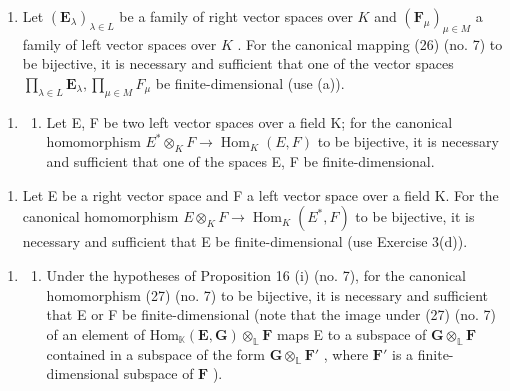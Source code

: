 \begin{enumerate}
\def\labelenumi{(\alph{enumi})}
\setcounter{enumi}{1}
\tightlist
\item
  Let \((\mathbf{E}_{\lambda})_{\lambda \in L}\) be a family of right vector spaces over \(K\) and \((\mathbf{F}_{\mu})_{\mu \in M}\) a family of left vector spaces over \(K\) . For the canonical mapping (26) (no. 7) to be bijective, it is necessary and sufficient that one of the vector spaces \(\prod_{\lambda \in L} \mathbf{E}_{\lambda}, \prod_{\mu \in M} F_{\mu}\) be finite-dimensional (use (a)).
\end{enumerate}

\begin{enumerate}
\def\labelenumi{\arabic{enumi}.}
\setcounter{enumi}{25}
\tightlist
\item
  \begin{enumerate}
  \def\labelenumii{(\alph{enumii})}
  \tightlist
  \item
    Let E, F be two left vector spaces over a field K; for the canonical homomorphism \(E^{*} \otimes_{K} F \to \operatorname{Hom}_{K}(E, F)\) to be bijective, it is necessary and sufficient that one of the spaces E, F be finite-dimensional.
  \end{enumerate}
\end{enumerate}

\begin{enumerate}
\def\labelenumi{(\alph{enumi})}
\setcounter{enumi}{1}
\tightlist
\item
  Let E be a right vector space and F a left vector space over a field K. For the canonical homomorphism \(E \otimes_{K} F \to \operatorname{Hom}_{K}(E^{*}, F)\) to be bijective, it is necessary and sufficient that E be finite-dimensional (use Exercise 3(d)).
\end{enumerate}

\begin{enumerate}
\def\labelenumi{\arabic{enumi}.}
\setcounter{enumi}{26}
\tightlist
\item
  \begin{enumerate}
  \def\labelenumii{(\alph{enumii})}
  \tightlist
  \item
    Under the hypotheses of Proposition 16 (i) (no. 7), for the canonical homomorphism (27) (no. 7) to be bijective, it is necessary and sufficient that E or F be finite-dimensional (note that the image under (27) (no. 7) of an element of \(\mathrm{Hom}_{\mathbb{K}}(\mathbf{E},\mathbf{G})\otimes_{\mathbb{L}}\mathbf{F}\) maps E to a subspace of \(\mathbf{G}\otimes_{\mathbb{L}}\mathbf{F}\) contained in a subspace of the form \(\mathbf{G}\otimes_{\mathbb{L}}\mathbf{F}'\) , where \(\mathbf{F}'\) is a finite-dimensional subspace of \(\mathbf{F}\) ).
  \end{enumerate}
\end{enumerate}

